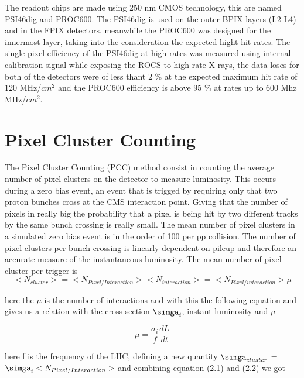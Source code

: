 The readout chips are made using 250 nm CMOS technology, this are named PSI46dig and PROC600. The PSI46dig is used on the outer BPIX layers (L2-L4) and in the FPIX detectors, meanwhile the PROC600 was designed for the innermost layer, taking into the consideration the expected hight hit rates. The single pixel efficiency of the PSI46dig at high rates was measured using internal calibration signal while exposing the ROCS to high-rate X-rays, the data loses for both of the detectors were of less thant 2 \% at the expected maximum hit rate of 120 MHz/$cm^{2}$ and the PROC600 efficiency is above 95 \% at rates up to 600 Mhz MHz/$cm^{2}$.

\section{Pixel Cluster Counting}

The Pixel Cluster Counting (PCC) method consist in counting the average number of pixel clusters on the detector to measure luminosity. This occurs during a zero bias event, an event that is trigged by requiring only that two proton bunches cross at the CMS interaction point. Giving that the number of pixels in really big the probability that a pixel is being hit by two different tracks by the same bunch crossing is really small. The mean number of pixel clusters in a simulated zero bias event is in the order of 100 per pp collision. The number of pixel clusters per bunch crossing is linearly dependent on pileup and therefore an accurate measure of the instantaneous luminosity.\cite{PCC1} The mean number of pixel cluster per trigger is \\ 


\begin{equation}
<N_{cluster}> = <N_{Pixel/Interaction}> <N_{interaction}> = <N_{Pixel/interaction}> \mu 
\end{equation}

here the $\mu$ is the number of interactions and with this the following equation and gives us a relation with the cross section $\simga_{i}$, instant luminosity and $\mu$

\begin{equation}
\mu = \frac{\sigma_{i}}{f}\frac{dL}{dt}
\end{equation}

here f is the frequency of the LHC, defining a new quantity $\simga_{cluster}$ = $\simga_{i}<N_{Pixel/Interaction}> $ and combining equation (2.1) and (2.2) we got

